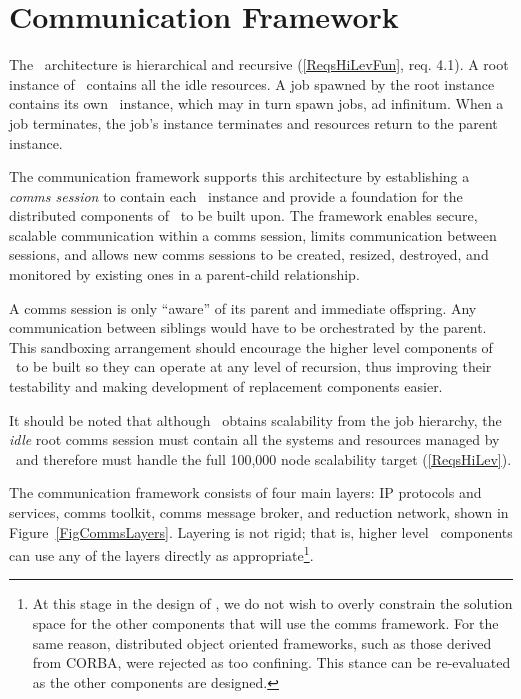 \section{Communication Framework}
\label{sect:comms}

The \ngrm\ architecture is hierarchical and recursive
(\ref{ReqsHiLevFun}, req. 4.1).
A root instance of \ngrm\ contains all the
idle resources.  A job spawned by the root instance contains
its own \ngrm\ instance, which may in turn spawn jobs, ad infinitum.
When a job terminates, the job's instance terminates and resources
return to the parent instance.

The communication framework supports this architecture by
establishing a {\em comms session} to contain each \ngrm\ instance
and provide a foundation for the distributed components of \ngrm\ to
be built upon.
The framework enables secure, scalable communication
within a comms session, limits communication between sessions,
and allows new comms sessions to be created, resized, destroyed,
and monitored by existing ones in a parent-child relationship.
\ifcomments
{}
\fi

A comms session is only ``aware'' of its parent and immediate offspring.
Any communication between siblings would have to be orchestrated by
the parent.  This sandboxing arrangement should encourage the higher level
components of \ngrm\ 
to be built so they can operate at any level of recursion, thus improving
their testability and making development of replacement components easier.

It should be noted that although \ngrm\ obtains scalability from the job
hierarchy, the {\em idle} root comms session must contain all the systems and
resources managed by \ngrm\ and therefore must handle the full 100,000 node
scalability target (\ref{ReqsHiLev}).

The communication framework consists of four main layers:
IP protocols and services, comms toolkit, comms message broker, and
reduction network, shown
in Figure~\ref{FigCommsLayers}.  Layering is not rigid;
that is, higher level \ngrm\ components can use any of the
layers directly as appropriate\footnote{At this stage in the design of \ngrm,
we do not wish to overly constrain the solution space for the other
components that will use the comms framework.  For the same reason,
distributed object oriented frameworks, such as those derived from
CORBA, were rejected as too confining.  This stance can be re-evaluated
as the other components are designed.}.


